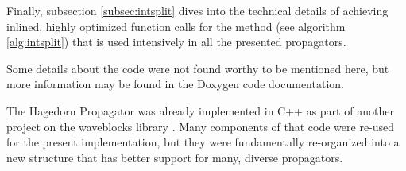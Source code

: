 Finally, subsection \ref{subsec:intsplit} dives into the technical details of achieving inlined, highly optimized function calls for the  method (see algorithm \ref{alg:intsplit}) that is used intensively in all the presented propagators.
\par\medskip
%
Some details about the code were not found worthy to be mentioned here,
but more information may be found in the Doxygen code documentation.
\par\medskip
%
The Hagedorn Propagator was already implemented in C++ as part of another project on the waveblocks library \cite{libwaveblocks}.
Many components of that code were re-used for the present implementation, but they were fundamentally re-organized into a new structure that has better support for many, diverse propagators.


